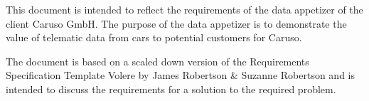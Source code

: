 This document is intended to reflect the requirements of the data appetizer of the client Caruso GmbH. The purpose of the data appetizer is to demonstrate the value of telematic data from cars to potential customers for Caruso.

The document is based on a scaled down version of the Requirements Specification Template Volere by James Robertson & Suzanne Robertson and is intended to discuss the requirements for a solution to the required problem.